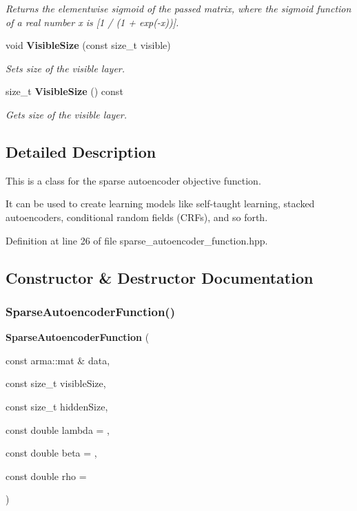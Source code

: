 \begin{DoxyCompactItemize}
\begin{DoxyCompactList}\small\item\em Returns the elementwise sigmoid of the passed matrix, where the sigmoid function of a real number \textquotesingle{}x\textquotesingle{} is [1 / (1 + exp(-\/x))]. \end{DoxyCompactList}\item 
void \textbf{ Visible\+Size} (const size\+\_\+t visible)
\begin{DoxyCompactList}\small\item\em Sets size of the visible layer. \end{DoxyCompactList}\item 
size\+\_\+t \textbf{ Visible\+Size} () const
\begin{DoxyCompactList}\small\item\em Gets size of the visible layer. \end{DoxyCompactList}\end{DoxyCompactItemize}


\subsection{Detailed Description}
This is a class for the sparse autoencoder objective function. 

It can be used to create learning models like self-\/taught learning, stacked autoencoders, conditional random fields (C\+R\+Fs), and so forth. 

Definition at line 26 of file sparse\+\_\+autoencoder\+\_\+function.\+hpp.



\subsection{Constructor \& Destructor Documentation}
\mbox{\label{classmlpack_1_1nn_1_1SparseAutoencoderFunction_a4a7a43662bc32bf255eb155815e3585c}} 
\subsubsection{Sparse\+Autoencoder\+Function()}
{\footnotesize\ttfamily \textbf{ Sparse\+Autoencoder\+Function} (\begin{DoxyParamCaption}\item[{const arma\+::mat \&}]{data,  }\item[{const size\+\_\+t}]{visible\+Size,  }\item[{const size\+\_\+t}]{hidden\+Size,  }\item[{const double}]{lambda = {},  }\item[{const double}]{beta = {},  }\item[{const double}]{rho = {} }\end{DoxyParamCaption})}



